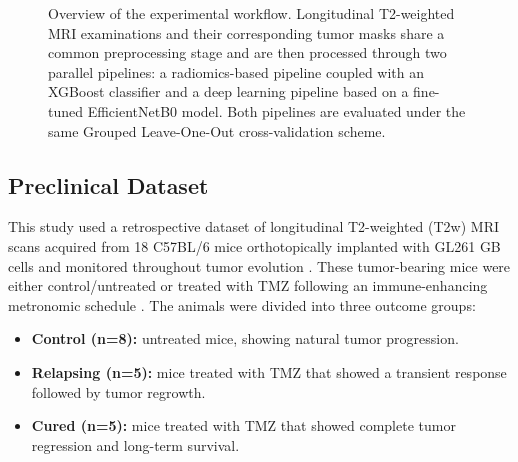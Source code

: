 \documentclass{article}
\begin{document}
\begin{figure}[H]
{%
}
\caption{Overview of the experimental workflow. Longitudinal T2-weighted MRI examinations and their corresponding tumor masks share a common preprocessing stage and are then processed through two parallel pipelines: a radiomics-based pipeline coupled with an XGBoost classifier and a deep learning pipeline based on a fine-tuned EfficientNetB0 model. Both pipelines are evaluated under the same Grouped Leave-One-Out cross-validation scheme.}
\label{fig:pipeline}
\end{figure}

\subsection{Preclinical Dataset}

This study used a retrospective dataset of longitudinal T2-weighted (T2w) MRI scans acquired from 18 C57BL/6 mice orthotopically implanted with GL261 GB cells and monitored throughout tumor evolution \cite{Wu2020}. These tumor-bearing mice were either control/untreated or treated with TMZ following an immune-enhancing metronomic schedule \cite{Wu2015}. The animals were divided into three outcome groups:
\begin{itemize}
    \item \textbf{Control (n=8):} untreated mice, showing natural tumor progression.
    \item \textbf{Relapsing (n=5):} mice treated with TMZ that showed a transient response followed by tumor regrowth.
    \item \textbf{Cured (n=5):} mice treated with TMZ that showed complete tumor regression and long-term survival.
\end{itemize}
\end{document}
